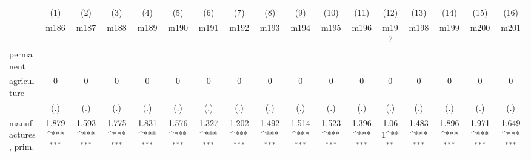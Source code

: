 {
\def\sym#1{\ifmmode^{#1}\else\(^{#1}\)\fi}
\begin{tabular}{l*{16}{c}}
\hline\hline
                    &\multicolumn{1}{c}{(1)}&\multicolumn{1}{c}{(2)}&\multicolumn{1}{c}{(3)}&\multicolumn{1}{c}{(4)}&\multicolumn{1}{c}{(5)}&\multicolumn{1}{c}{(6)}&\multicolumn{1}{c}{(7)}&\multicolumn{1}{c}{(8)}&\multicolumn{1}{c}{(9)}&\multicolumn{1}{c}{(10)}&\multicolumn{1}{c}{(11)}&\multicolumn{1}{c}{(12)}&\multicolumn{1}{c}{(13)}&\multicolumn{1}{c}{(14)}&\multicolumn{1}{c}{(15)}&\multicolumn{1}{c}{(16)}\\
                    &\multicolumn{1}{c}{m186}&\multicolumn{1}{c}{m187}&\multicolumn{1}{c}{m188}&\multicolumn{1}{c}{m189}&\multicolumn{1}{c}{m190}&\multicolumn{1}{c}{m191}&\multicolumn{1}{c}{m192}&\multicolumn{1}{c}{m193}&\multicolumn{1}{c}{m194}&\multicolumn{1}{c}{m195}&\multicolumn{1}{c}{m196}&\multicolumn{1}{c}{m197}&\multicolumn{1}{c}{m198}&\multicolumn{1}{c}{m199}&\multicolumn{1}{c}{m200}&\multicolumn{1}{c}{m201}\\
\hline
permanent           &                     &                     &                     &                     &                     &                     &                     &                     &                     &                     &                     &                     &                     &                     &                     &                     \\
agriculture         &           0         &           0         &           0         &           0         &           0         &           0         &           0         &           0         &           0         &           0         &           0         &           0         &           0         &           0         &           0         &           0         \\
                    &         (.)         &         (.)         &         (.)         &         (.)         &         (.)         &         (.)         &         (.)         &         (.)         &         (.)         &         (.)         &         (.)         &         (.)         &         (.)         &         (.)         &         (.)         &         (.)         \\
[1em]
manufactures, prim. &       1.879\sym{***}&       1.593\sym{***}&       1.775\sym{***}&       1.831\sym{***}&       1.576\sym{***}&       1.327\sym{***}&       1.202\sym{***}&       1.492\sym{***}&       1.514\sym{***}&       1.523\sym{***}&       1.396\sym{***}&       1.061\sym{**} &       1.483\sym{***}&       1.896\sym{***}&       1.971\sym{***}&       1.649\sym{***}\\

\end{tabular}}

